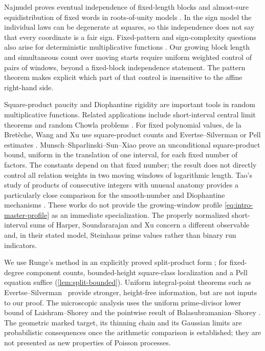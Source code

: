 Najnudel proves eventual independence of fixed-length blocks and almost-sure
equidistribution of fixed words in roots-of-unity models \cite{Najnudel2020}.
In the sign model the individual laws can be degenerate at squares, so
this independence does not say that every coordinate is a fair sign. Fixed-pattern and sign-complexity questions also
arise for deterministic multiplicative functions
\cite{ButtkewitzElsholtz2011,MatomakiRadziwillTao2016,Mangerel2024}.
Our growing block length and simultaneous count over moving starts require
uniform weighted control of pairs of windows, beyond a fixed-block
independence statement. The pattern theorem makes explicit which part of that
control is insensitive to the affine right-hand side.

Square-product paucity and Diophantine rigidity are important tools in random
multiplicative functions. Related applications include short-interval central
limit theorems and random Chowla problems
\cite{ChatterjeeSoundararajan2012,SoundararajanXu2023,KlurmanShkredovXu2023,ChinisShala2025}. For fixed polynomial values, de la Bret\`eche, Wang and Xu
use square-product counts and Evertse--Silverman or Pell estimates
\cite{deLaBretecheWangXu2026}. Munsch--Shparlinski--Sun--Xiao
\cite[Theorem~1.3]{MunschShparlinskiSunXiao2026} prove an unconditional
square-product bound, uniform in the translation of one interval, for
each fixed number of factors. The constants depend on that fixed number;
the result does not directly control all relation weights in two moving
windows of logarithmic length. Tao's study of products of consecutive integers
with unusual anatomy provides a particularly close comparison for the
smooth-number and Diophantine mechanisms \cite{Tao2026}.
These works do not provide the growing-window profile
\eqref{eq:intro-master-profile} as an immediate specialization.
The properly normalized short-interval sums of Harper, Soundararajan and Xu
\cite{HarperSoundararajanXu2026} concern a different observable and, in their
stated model, Steinhaus prime values rather than binary run indicators.

We use Runge's method in an explicitly proved split-product form
\cite{Runge1887,Walsh1992}; for fixed-degree component counts, bounded-height square-class localization
and a Pell equation suffice (\cref{lem:split-bounded}). Uniform integral-point
theorems such as Evertse--Silverman~\cite{EvertseSilverman1986} provide
stronger, height-free information, but are not inputs to our proof.
The microscopic analysis uses
the uniform prime-divisor lower bound of Laishram--Shorey
\cite{LaishramShorey2004} and the pointwise result of
Balasubramanian--Shorey \cite{BalasubramanianShorey1993}.
The geometric marked target, its thinning chain and its Gaussian limits are
probabilistic consequences once the arithmetic comparison is established;
they are not presented as new properties of Poisson processes.

